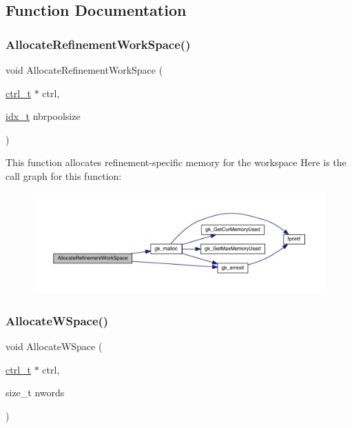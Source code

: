 \subsection{Function Documentation}
\mbox{\label{a00984_a2b337cc68be55b7e8b6d2218fcea855d}} 
\subsubsection{\texorpdfstring{Allocate\+Refinement\+Work\+Space()}{AllocateRefinementWorkSpace()}}
{\footnotesize\ttfamily void Allocate\+Refinement\+Work\+Space (\begin{DoxyParamCaption}\item[{\hyperlink{a00742}{ctrl\+\_\+t} $\ast$}]{ctrl,  }\item[{\hyperlink{a00876_aaa5262be3e700770163401acb0150f52}{idx\+\_\+t}}]{nbrpoolsize }\end{DoxyParamCaption})}

This function allocates refinement-\/specific memory for the workspace Here is the call graph for this function\+:\nopagebreak
\begin{figure}[H]
\begin{center}
\leavevmode
\includegraphics[width=350pt]{a00984_a2b337cc68be55b7e8b6d2218fcea855d_cgraph}
\end{center}
\end{figure}
\mbox{\label{a00984_aaedfa12582d61baba3729f8204d9fddb}} 
\subsubsection{\texorpdfstring{Allocate\+W\+Space()}{AllocateWSpace()}}
{\footnotesize\ttfamily void Allocate\+W\+Space (\begin{DoxyParamCaption}\item[{\hyperlink{a00742}{ctrl\+\_\+t} $\ast$}]{ctrl,  }\item[{size\+\_\+t}]{nwords }\end{DoxyParamCaption})}

